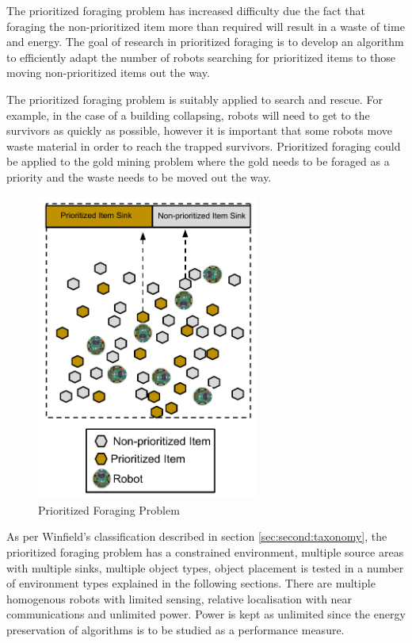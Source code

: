The prioritized foraging problem has increased difficulty due the fact that  foraging the non-prioritized item more than required will result in a waste of time and energy. The goal of research in prioritized foraging is to develop an algorithm to efficiently adapt the number of robots searching for prioritized items to those moving non-prioritized items out the way. 

The prioritized foraging problem is suitably applied to search and rescue. For example, in the case of a building collapsing, robots will need to get to the survivors as quickly as possible, however it is important that some robots move waste material in order to reach the trapped survivors. Prioritized foraging could be applied to the gold mining problem where the gold needs to be foraged as a priority and the waste needs to be moved out the way.


\begin{figure} [h]
	\centering
	\includegraphics[width=0.65\textwidth]{chapters/chapter2/figures/EpuckGoldMining.pdf}
	\caption{Prioritized Foraging Problem }
	\label{prioritizedforaging}
\end{figure}

As per Winfield's classification described in section \ref{sec:second:taxonomy}, the prioritized foraging problem has a constrained environment, multiple source areas with multiple sinks, multiple object types, object placement is tested in a number of environment types explained in the following sections. There are multiple homogenous robots with limited sensing, relative localisation with near communications and unlimited power. Power is kept as unlimited since the energy preservation of algorithms is to be studied as a performance measure. 



